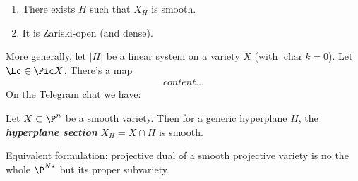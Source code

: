\begin{thm}[Bertini]\leavevmode
	\begin{enumerate}
		\item There exists $H$ such that $X_H$ is smooth.
		\item It is Zariski-open (and dense).
	\end{enumerate}
\end{thm}
More generally, let $|H|$ be a linear system on a variety $X$ (with $\operatorname{char} k=0$). Let $\Lc\in\Pic X$. There's a map
\begin{align*}
	content...
\end{align*}
On the Telegram chat we have:
\begin{thm}[Bertini]
	Let $X\subset\P^n$ be a smooth variety. Then for a generic hyperplane $H$, the \textbf{\textit{hyperplane section}} $X_H=X\cap H$ is smooth.
	
	Equivalent formulation: projective dual of a smooth projective variety is no the whole $\P^{N*}$ but its proper subvariety.
\end{thm}


